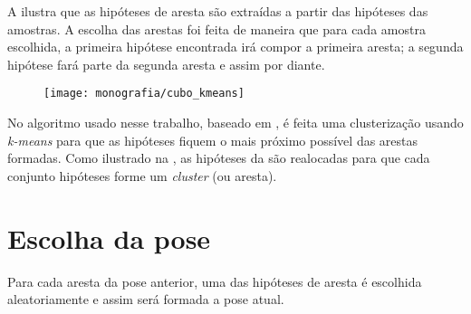 A  ilustra que as hipóteses de aresta são extraídas a partir das hipóteses das amostras. A escolha das arestas foi feita de maneira que para cada amostra escolhida, a primeira hipótese encontrada irá compor a primeira aresta; a segunda hipótese fará parte da segunda aresta e assim por diante.

\begin{figure}[ht!]
\centering
\texttt{[image: monografia/cubo\_kmeans]}
\caption{}
\label{cubo_kmeans}
\end{figure}

No algoritmo usado nesse trabalho, baseado em \cite{celine}, é feita uma clusterização usando \emph{k-means} para que as hipóteses fiquem o mais próximo possível das arestas formadas. Como ilustrado na , as hipóteses da  são realocadas para que cada conjunto hipóteses forme um \emph{cluster} (ou aresta).

\section{Escolha da pose}

Para cada aresta da pose anterior, uma das hipóteses de aresta é escolhida aleatoriamente e assim será formada a pose atual.

\begin{comment}
\section{A FAZER}

\begin{enumerate}
\item Descrever o moving-edges. Mostrar que com múltiplas hipóteses a $n$-ésima hipótese de ponto vai corresponder à $n$-ésima hipótese de aresta.
\item Falar sobre \cite{celine}. As hipóteses de pontos vão formar arestas tal que elas fiquem as mais paralelas possíveis da aresta da cena atual.
\item colocar figuras para ilustrar
\end{enumerate}
\end{comment}
